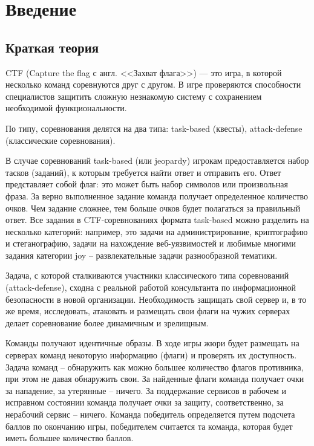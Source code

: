 \section{Введение}
\subsection{Краткая теория}

CTF (Capture the flag с англ. <<Захват флага>>) --- это игра, в которой несколько команд соревнуются друг с другом. В игре проверяются способности специалистов защитить сложную незнакомую систему с сохранением необходимой функциональности. \par 

По типу, соревнования делятся на два типа: task-based (квесты), attack-defense (классические соревнования).\par 

В случае соревнований task-based (или jeopardy) игрокам предоставляется набор тасков (заданий), к которым требуется найти ответ и отправить его. Ответ представляет собой флаг: это может быть набор символов или произвольная фраза. За верно выполненное задание команда получает определенное количество очков. Чем задание сложнее, тем больше очков будет полагаться за правильный ответ. Все задания в CTF-соревнованиях формата task-based можно разделить на несколько категорий: например, это задачи на администрирование, криптографию и стеганографию, задачи на нахождение веб-уязвимостей и любимые многими задания категории joy – развлекательные задачи разнообразной тематики.\par

Задача, с которой сталкиваются участники классического типа соревнований (attack-defense), сходна с реальной работой консультанта по информационной безопасности в новой организации. Необходимость защищать свой сервер и, в то же время, исследовать, атаковать и размещать свои флаги на чужих серверах делает соревнование более динамичным и зрелищным.\par 

Команды получают идентичные образы. В ходе игры жюри будет размещать на серверах команд некоторую информацию (флаги) и проверять их доступность. Задача команд – обнаружить как можно большее количество флагов противника, при этом не давая обнаружить свои. За найденные флаги команда получает очки за нападение, за утерянные – ничего. За поддержание сервисов в рабочем и исправном состоянии команда получает очки за защиту, соответственно, за нерабочий сервис – ничего. Команда победитель определяется путем подсчета баллов по окончанию игры, победителем считается та команда, которая будет иметь большее количество баллов.\\

